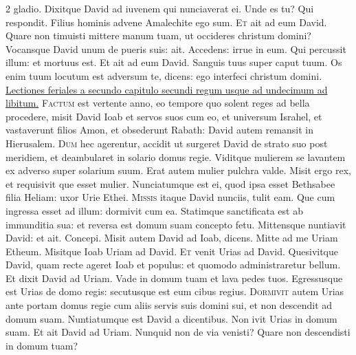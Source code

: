 \begin{multicols*}{2}
gladio. Dixitque David ad iuvenem qui nunciaverat ei. Unde es tu? Qui respondit. Filius hominis advene Amalechite ego sum.
\lettrine[lines=2]{\zallmancaps \color{Red} E}{t} ait ad eum David. Quare non timuisti mittere manum tuam, ut occideres christum domini? Vocansque David unum de pueris suis: ait. Accedens: irrue in eum. Qui percussit illum: et mortuus est. Et ait ad eum David. Sanguis tuus super caput tuum. Os enim tuum locutum est adversum te, dicens: ego interfeci christum domini.
\newline \ul{Lectiones feriales a secundo capitulo secundi regum usque ad undecimum ad libitum.}
{\color{Red} }
\lettrine[lines=2]{\zallmancaps \color{Blue} F}{actum} est vertente anno, eo tempore quo solent reges ad bella procedere, misit David Ioab et servos suos cum eo, et universum Israhel, et vastaverunt filios Amon, et obsederunt Rabath: David autem remansit in Hierusalem.%
\lettrine[lines=2]{\zallmancaps \color{Red} D}{um} hec agerentur, accidit ut surgeret David de strato suo post meridiem, et deambularet in solario domus regie. Viditque mulierem se lavantem ex adverso super solarium suum. Erat autem mulier pulchra valde. Misit ergo rex, et requisivit que esset mulier. Nunciatumque est ei, quod ipsa esset Bethsabee filia Heliam: uxor Urie Ethei.
\lettrine[lines=2]{\zallmancaps \color{Blue} M}{issis} itaque David nunciis, tulit eam. Que cum ingressa esset ad illum: dormivit cum ea. Statimque sanctificata est ab immunditia sua: et reversa est domum suam concepto fetu. Mittensque nuntiavit David: et ait. Concepi. Misit autem David ad Ioab, dicens. Mitte ad me Uriam Etheum. Misitque Ioab Uriam ad David.
\lettrine[lines=2]{\zallmancaps \color{Red} E}{t} venit Urias ad David. Quesivitque David, quam recte ageret Ioab et populus: et quomodo administraretur bellum. Et dixit David ad Uriam. Vade in domum tuam et lava pedes tuos. Egressusque est Urias de domo regis: secutusque est eum cibus regius.
\lettrine[lines=2]{\zallmancaps \color{Blue} D}{ormivit} autem Urias ante portam domus regie cum aliis servis suis domini sui, et non descendit ad domum suam. Nuntiatumque est David a dicentibus. Non ivit Urias in domum suam. Et ait David ad Uriam. Nunquid non de via venisti? Quare non descendisti in domum tuam?

\end{multicols*}
